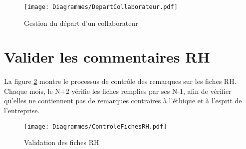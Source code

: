 \begin{figure}
	\centering
	\begin{sideways}
	\texttt{[image: Diagrammes/DepartCollaborateur.pdf]}
	\end{sideways}
	\caption{Gestion du départ d'un collaborateur}
	\label{easyGo}	
\end{figure}




\section{Valider les commentaires RH}

\paragraph{} La figure \ref{fichesRH} montre le processus de contrôle des remarques sur les fiches RH. Chaque mois, le N+2 vérifie les fiches remplies par ses N-1, afin de vérifier qu'elles ne contiennent pas de remarques contraires à l'éthique et à l'esprit de l'entreprise.


\begin{figure}
	\centering
	\texttt{[image: Diagrammes/ControleFichesRH.pdf]}
	\caption{Validation des fiches RH}
	\label{fichesRH}	
\end{figure}